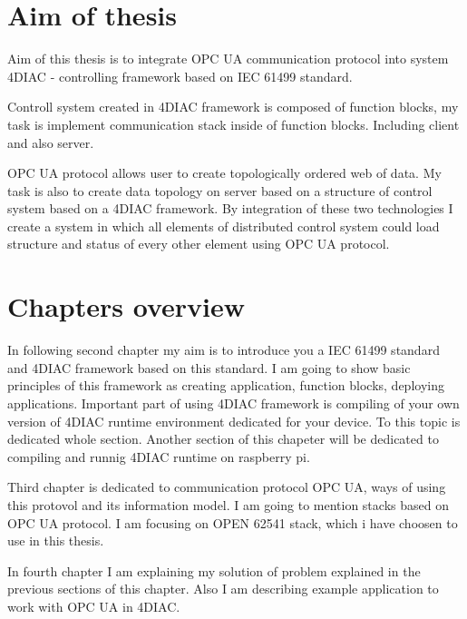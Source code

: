 \section{Aim of thesis}
Aim of this thesis is to integrate OPC UA communication protocol into system 4DIAC - controlling framework based on IEC 61499 standard. 

Controll system created in 4DIAC framework is composed of function blocks, my task is implement communication stack inside of function blocks. Including client and also server. 

OPC UA protocol allows user to create topologically ordered web of data. My task is also to create data topology on server based on a structure of control system based on a 4DIAC framework. By integration of these two technologies I create a system in which all elements of distributed control system could load structure and status of every other element using OPC UA protocol. 




\section{Chapters overview}

In following second chapter my aim is to introduce you a IEC 61499 standard and 4DIAC framework based on this standard.
I am going to show basic principles of this framework as creating application, function blocks, deploying applications.
Important part of using 4DIAC framework is compiling of your own version of 4DIAC runtime environment dedicated for your device. To this topic is dedicated whole section. Another section of this chapeter will be dedicated to compiling and runnig 4DIAC runtime on raspberry pi. 

Third chapter is dedicated to communication protocol OPC UA, ways of using this protovol and its information model. I am going to mention stacks based on OPC UA protocol. I am focusing on OPEN 62541 stack, which i have choosen to use in this thesis. 

In fourth chapter I am explaining my solution of problem explained in the previous sections of this chapter. Also I am describing example application to work with OPC UA in 4DIAC.




